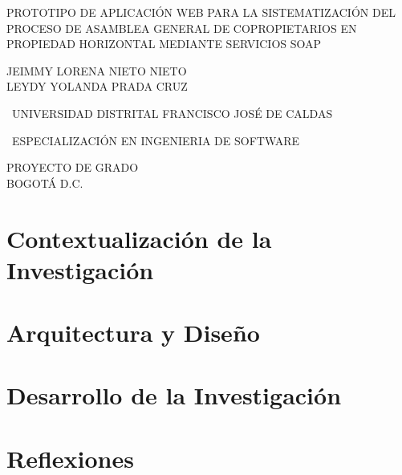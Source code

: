 \documentclass[letter,12pt,openany]{book}
\begin{document}
\begin{titlepage}
	\centering	
	{\scshape\LARGE PROTOTIPO DE APLICACIÓN WEB PARA LA SISTEMATIZACIÓN DEL PROCESO DE ASAMBLEA GENERAL DE COPROPIETARIOS EN PROPIEDAD HORIZONTAL MEDIANTE SERVICIOS SOAP \par}
	\vspace{4cm}
	{\scshape\Large JEIMMY LORENA NIETO NIETO\\
		LEYDY YOLANDA PRADA CRUZ\par}
	\vspace{4.5cm}
	
	{\Large\ UNIVERSIDAD DISTRITAL FRANCISCO JOSÉ DE CALDAS\par}
	{\Large\ ESPECIALIZACIÓN EN INGENIERIA DE SOFTWARE\par}
    PROYECTO DE GRADO \\
	BOGOTÁ D.C.
	
	\vfill
	
	\vfill
	
\end{titlepage}

\frontmatter
\tableofcontents
\listoftables
\listoffigures

\mainmatter

\part{Contextualización de la Investigación}

\part{Arquitectura y Diseño}








\part{Desarrollo de la Investigación}



\part{Reflexiones}


%


\backmatter


\end{document}
